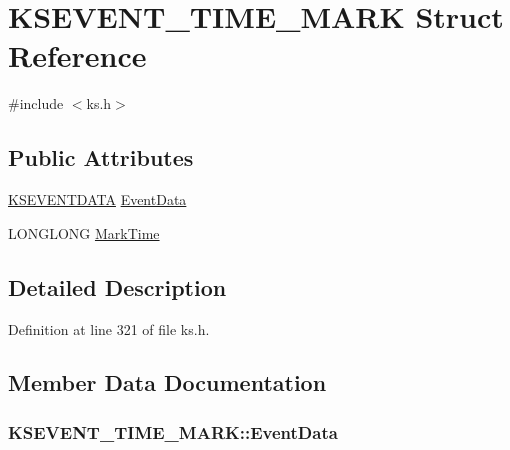 \hypertarget{struct_k_s_e_v_e_n_t___t_i_m_e___m_a_r_k}{}\section{K\+S\+E\+V\+E\+N\+T\+\_\+\+T\+I\+M\+E\+\_\+\+M\+A\+RK Struct Reference}
\label{struct_k_s_e_v_e_n_t___t_i_m_e___m_a_r_k}


{\ttfamily \#include $<$ks.\+h$>$}

\subsection*{Public Attributes}
\begin{DoxyCompactItemize}
\item 
\hyperlink{struct_k_s_e_v_e_n_t_d_a_t_a}{K\+S\+E\+V\+E\+N\+T\+D\+A\+TA} \hyperlink{struct_k_s_e_v_e_n_t___t_i_m_e___m_a_r_k_ae0652789a2c0461bbfd466e49c0e0b08}{Event\+Data}
\item 
L\+O\+N\+G\+L\+O\+NG \hyperlink{struct_k_s_e_v_e_n_t___t_i_m_e___m_a_r_k_a99954f7ba2df2f168051a514bfb03b66}{Mark\+Time}
\end{DoxyCompactItemize}


\subsection{Detailed Description}


Definition at line 321 of file ks.\+h.



\subsection{Member Data Documentation}
\subsubsection[{\texorpdfstring{Event\+Data}{EventData}}]{ K\+S\+E\+V\+E\+N\+T\+\_\+\+T\+I\+M\+E\+\_\+\+M\+A\+R\+K\+::\+Event\+Data}\hypertarget{struct_k_s_e_v_e_n_t___t_i_m_e___m_a_r_k_ae0652789a2c0461bbfd466e49c0e0b08}{}\label{struct_k_s_e_v_e_n_t___t_i_m_e___m_a_r_k_ae0652789a2c0461bbfd466e49c0e0b08}


